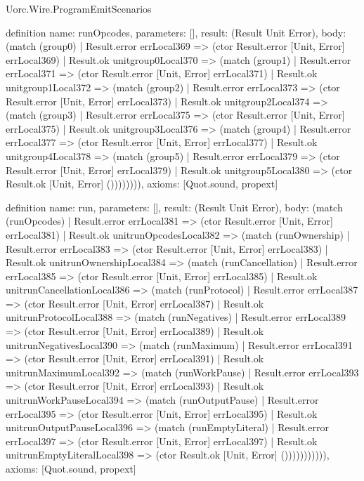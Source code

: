 \begin{lexlean}{Uorc.Wire.ProgramEmitScenarios}
\begin{semanticmodule}
definition{
  name: runOpcodes,
  parameters: [],
  result: (Result Unit Error),
  body: (match (group0)
    | Result.error errLocal369 => (ctor Result.error [Unit, Error] errLocal369)
    | Result.ok unitgroup0Local370 => (match (group1)
      | Result.error errLocal371 => (ctor Result.error [Unit, Error] errLocal371)
      | Result.ok unitgroup1Local372 => (match (group2)
        | Result.error errLocal373 => (ctor Result.error [Unit, Error] errLocal373)
        | Result.ok unitgroup2Local374 => (match (group3)
          | Result.error errLocal375 => (ctor Result.error [Unit, Error] errLocal375)
          | Result.ok unitgroup3Local376 => (match (group4)
            | Result.error errLocal377 => (ctor Result.error [Unit, Error] errLocal377)
            | Result.ok unitgroup4Local378 => (match (group5)
              | Result.error errLocal379 => (ctor Result.error [Unit, Error] errLocal379)
              | Result.ok unitgroup5Local380 => (ctor Result.ok [Unit, Error] ()))))))),
  axioms: [Quot.sound, propext]
}

definition{
  name: run,
  parameters: [],
  result: (Result Unit Error),
  body: (match (runOpcodes)
    | Result.error errLocal381 => (ctor Result.error [Unit, Error] errLocal381)
    | Result.ok unitrunOpcodesLocal382 => (match (runOwnership)
      | Result.error errLocal383 => (ctor Result.error [Unit, Error] errLocal383)
      | Result.ok unitrunOwnershipLocal384 => (match (runCancellation)
        | Result.error errLocal385 => (ctor Result.error [Unit, Error] errLocal385)
        | Result.ok unitrunCancellationLocal386 => (match (runProtocol)
          | Result.error errLocal387 => (ctor Result.error [Unit, Error] errLocal387)
          | Result.ok unitrunProtocolLocal388 => (match (runNegatives)
            | Result.error errLocal389 => (ctor Result.error [Unit, Error] errLocal389)
            | Result.ok unitrunNegativesLocal390 => (match (runMaximum)
              | Result.error errLocal391 => (ctor Result.error [Unit, Error] errLocal391)
              | Result.ok unitrunMaximumLocal392 => (match (runWorkPause)
                | Result.error errLocal393 => (ctor Result.error [Unit, Error] errLocal393)
                | Result.ok unitrunWorkPauseLocal394 => (match (runOutputPause)
                  | Result.error errLocal395 => (ctor Result.error [Unit, Error] errLocal395)
                  | Result.ok unitrunOutputPauseLocal396 => (match (runEmptyLiteral)
                    | Result.error errLocal397 => (ctor Result.error [Unit, Error] errLocal397)
                    | Result.ok unitrunEmptyLiteralLocal398 => (ctor Result.ok [Unit, Error] ())))))))))),
  axioms: [Quot.sound, propext]
}
\end{semanticmodule}
\end{lexlean}
